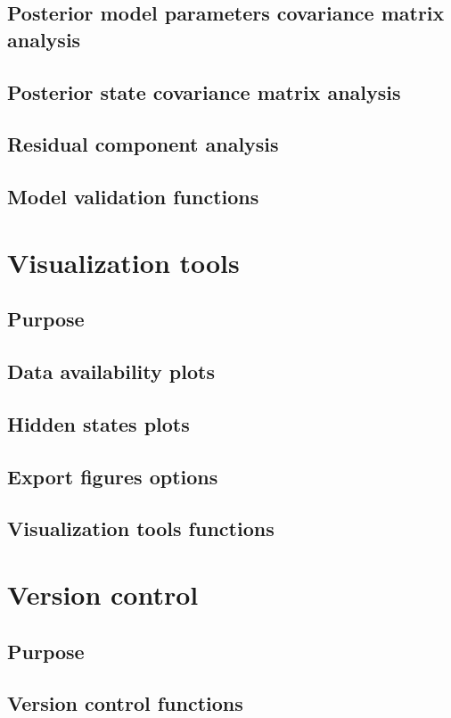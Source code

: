\documentclass{book}
\begin{document}
\section{Posterior model parameters covariance matrix analysis}
\section{Posterior state covariance matrix analysis}
\section{Residual component analysis}
\section{Model validation functions}
\newpage

\chapter{Visualization tools}
\section{Purpose}
\section{Data availability plots}
\section{Hidden states plots}
\section{Export figures options}
\section{Visualization tools functions}
\newpage


\chapter{Version control}
\section{Purpose}
\section{Version control functions}
\newpage
\end{document}
